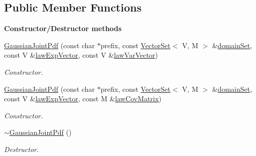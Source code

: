 \subsection*{Public Member Functions}
\begin{Indent}{\bf Constructor/\-Destructor methods}\par
\begin{DoxyCompactItemize}
\item 
\hyperlink{class_q_u_e_s_o_1_1_gaussian_joint_pdf_aefd24b17e6fe06c181ed01195da2df02}{Gaussian\-Joint\-Pdf} (const char $\ast$prefix, const \hyperlink{class_q_u_e_s_o_1_1_vector_set}{Vector\-Set}$<$ V, M $>$ \&\hyperlink{class_q_u_e_s_o_1_1_base_scalar_function_ad0937628825249dd36ded3ce0c7959ac}{domain\-Set}, const V \&\hyperlink{class_q_u_e_s_o_1_1_gaussian_joint_pdf_a927c7abde2026d17586013a04a0a053e}{law\-Exp\-Vector}, const V \&\hyperlink{class_q_u_e_s_o_1_1_gaussian_joint_pdf_ae7af4530bc9394393f3383b6321bc839}{law\-Var\-Vector})
\begin{DoxyCompactList}\small\item\em Constructor. \end{DoxyCompactList}\item 
\hyperlink{class_q_u_e_s_o_1_1_gaussian_joint_pdf_a8b89c4a2052624e85a9e1b680c2eb7f0}{Gaussian\-Joint\-Pdf} (const char $\ast$prefix, const \hyperlink{class_q_u_e_s_o_1_1_vector_set}{Vector\-Set}$<$ V, M $>$ \&\hyperlink{class_q_u_e_s_o_1_1_base_scalar_function_ad0937628825249dd36ded3ce0c7959ac}{domain\-Set}, const V \&\hyperlink{class_q_u_e_s_o_1_1_gaussian_joint_pdf_a927c7abde2026d17586013a04a0a053e}{law\-Exp\-Vector}, const M \&\hyperlink{class_q_u_e_s_o_1_1_gaussian_joint_pdf_a7f687f734404afd0e8b7e92b3d26e8bb}{law\-Cov\-Matrix})
\begin{DoxyCompactList}\small\item\em Constructor. \end{DoxyCompactList}\item 
\hyperlink{class_q_u_e_s_o_1_1_gaussian_joint_pdf_a9ccde39f230ce5fad138da5d289119bd}{$\sim$\-Gaussian\-Joint\-Pdf} ()
\begin{DoxyCompactList}\small\item\em Destructor. \end{DoxyCompactList}\end{DoxyCompactItemize}
\end{Indent}
